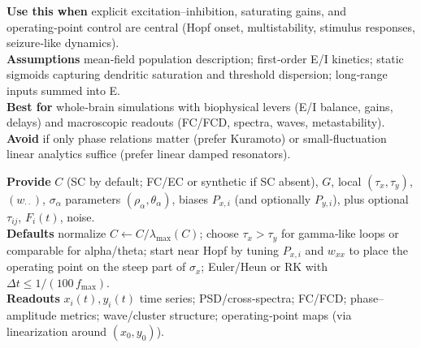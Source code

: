 \documentclass[11pt]{article}
\numberwithin{equation}{section}
\begin{document}
\begin{tcolorbox}[
  colback=gray!5,
  colframe=slate,
  colbacktitle=softblue!25,
  coltitle=softblue!60!black,
  fonttitle=\bfseries\small,
  title={\small When to Use It},
  boxrule=0.4pt, enhanced, sharp corners,
  left=4pt,right=4pt,top=3pt,bottom=3pt,
  boxsep=2pt, before skip=6pt, after skip=6pt
]
\scriptsize
\textbf{Use this when} explicit excitation–inhibition, saturating gains, and operating‑point control are central (Hopf onset, multistability, stimulus responses, seizure‑like dynamics).\\
\textbf{Assumptions} mean‑field population description; first‑order E/I kinetics; static sigmoids capturing dendritic saturation and threshold dispersion; long‑range inputs summed into E.\\
\textbf{Best for} whole‑brain simulations with biophysical levers (E/I balance, gains, delays) and macroscopic readouts (FC/FCD, spectra, waves, metastability).\\
\textbf{Avoid} if only phase relations matter (prefer Kuramoto) or small‑fluctuation linear analytics suffice (prefer linear damped resonators).
\end{tcolorbox}

\begin{tcolorbox}[
  colback=gray!5,
  colframe=slate,
  colbacktitle=softblue!25,
  coltitle=softblue!60!black,
  fonttitle=\bfseries\small,
  title={\small How to Use It},
  boxrule=0.4pt, enhanced, sharp corners,
  left=4pt,right=4pt,top=3pt,bottom=3pt,
  boxsep=2pt, before skip=6pt, after skip=6pt
]
\scriptsize
\textbf{Provide} $C$ (SC by default; FC/EC or synthetic if SC absent), $G$, local $(\tau_x,\tau_y)$, $(w_{\cdot\cdot})$, $\sigma_{\alpha}$ parameters $(\rho_{\alpha},\theta_{\alpha})$, biases $P_{x,i}$ (and optionally $P_{y,i}$), plus optional $\tau_{ij}$, $F_i(t)$, noise.\\
\textbf{Defaults} normalize $C\!\leftarrow\!C/\lambda_{\max}(C)$; choose $\tau_x\!>\!\tau_y$ for gamma‑like loops or comparable for alpha/theta; start near Hopf by tuning $P_{x,i}$ and $w_{xx}$ to place the operating point on the steep part of $\sigma_x$; Euler/Heun or RK with $\Delta t\!\le\!1/(100\,f_{\max})$.\\
\textbf{Readouts} $x_i(t),y_i(t)$ time series; PSD/cross‑spectra; FC/FCD; phase–amplitude metrics; wave/cluster structure; operating‑point maps (via linearization around $(x_0,y_0)$).
\end{tcolorbox}
\end{document}
